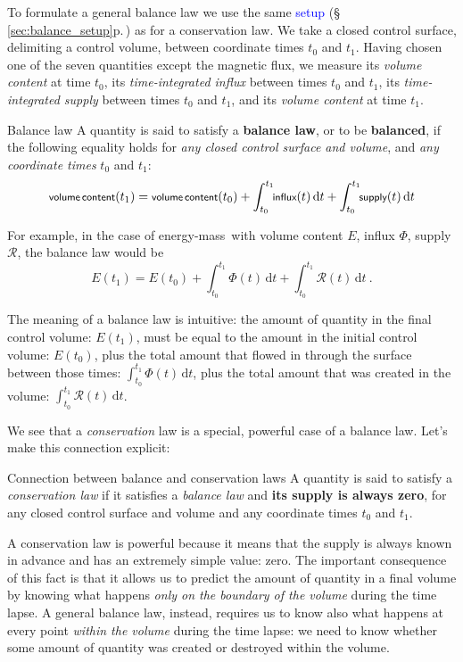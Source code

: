 \documentclass[a4paper,12pt,%
onecolumn,oneside,%
british%
]{memoir}
\newcommand*{\di}{\mathrm{d}}%
\renewcommand*{\|}[1][]{\nonscript\:#1\vert\nonscript\:\mathopen{}}
\newcommand*{\sect}{\S}%
\renewcommand*{\autoref}[3][\sect\,\ref]{\textcolor{blue}{#3} {\color{blue}\scriptsize(\faIcon[regular]{eye}\;#1{#2}\;p.\,\pageref{#2})}}
\newcommand*{\energym}{energy-mass}
\newcommand*{\yti}{t_{0}}
\newcommand*{\ytf}{t_{1}}
\newcommand*{\dt}{\di t}
\newcommand*{\yE}{E}
\newcommand*{\yH}{\varPhi}%
\newcommand*{\yR}{\mathcal{R}}%
\begin{document}
To formulate a general balance law we use the same \autoref{sec:balance_setup}{setup} as for a conservation law. We take a closed control surface, delimiting a control volume, between coordinate times $\yti$ and $\ytf$. Having chosen one of the seven quantities except the magnetic flux, we measure its \emph{volume content} at time $\yti$, its \emph{time-integrated influx} between times $\yti$ and $\ytf$, 
its  \emph{time-integrated supply}  between times $\yti$ and $\ytf$,
and its \emph{volume content} at time $\ytf$.

\begin{definition}{Balance law}
  A quantity is said to satisfy a \textbf{balance law}, or to be \textbf{balanced}, if the following equality holds for \emph{any closed control surface and volume}, and \emph{any coordinate times} $\yti$ and $\ytf$:
  \begin{equation}
    \label{eq:balanced}
    \textsf{\footnotesize volume\,content}(\ytf) =
    \textsf{\footnotesize volume\,content}(\yti) +
    \int_{\yti}^{\ytf}\!\!\textsf{\footnotesize influx}(t)\,\dt +
    \int_{\yti}^{\ytf}\!\!\textsf{\footnotesize supply}(t)\,\dt
  \end{equation}
\end{definition}
For example, in the case of \energym\ with volume content $\yE$, influx $\yH$, supply $\yR$, the balance law would be
\begin{equation*}
  \yE(\ytf) = \yE(\yti)
  + \int_{\yti}^{\ytf}\!\!\yH(t)\, \dt
  + \int_{\yti}^{\ytf}\!\!\yR(t)\,\dt \ .
\end{equation*}

The meaning of a balance law is intuitive: the amount of quantity in the final control volume: $\yE(\ytf)$, must be equal to the amount in the initial control volume: $\yE(\yti)$, plus the total amount that flowed in through the surface between those times:  $\int_{\yti}^{\ytf}\!\!\yH(t)\, \dt$, plus the total amount that was created in the volume: $\int_{\yti}^{\ytf}\!\!\yR(t)\, \dt$.

\medskip

We see that a \emph{conservation} law is a special, powerful case of a balance law. Let's make this connection explicit:
\begin{definition}{Connection between balance and conservation laws}
  A quantity is said to satisfy a \emph{conservation law} if it satisfies a \emph{balance law} and \textbf{its supply is always zero}, for any closed control surface and volume and any coordinate times $\yti$ and $\ytf$.
\end{definition}
A conservation law is powerful because it means that the supply is always known in advance and has an extremely simple value: zero. The important consequence of this fact is that it allows us to predict the amount of quantity in a final volume by knowing what happens \emph{only on the boundary of the volume} during the time lapse. A general balance law, instead, requires us to know also what happens at every point \emph{within the volume} during the time lapse: we need to know whether some amount of quantity was created or destroyed within the volume.
\end{document}
